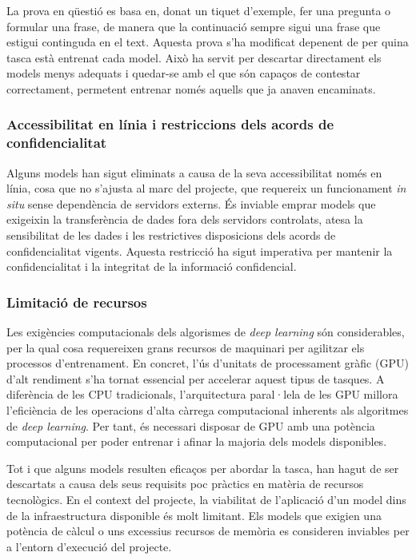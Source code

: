 La prova en qüestió es basa en, donat un tiquet d'exemple, fer una pregunta o formular una frase, de manera que la continuació sempre sigui una frase que estigui continguda en el text. Aquesta prova s'ha modificat depenent de per quina tasca està entrenat cada model. Això ha servit per descartar directament els models menys adequats i quedar-se amb el que són capaços de contestar correctament, permetent entrenar només aquells que ja anaven encaminats.

\subsubsection{Accessibilitat en línia i restriccions dels acords de confidencialitat}
Alguns models han sigut eliminats a causa de la seva accessibilitat només en línia, cosa que no s'ajusta al marc del projecte, que requereix un funcionament \textit{in situ} sense dependència de servidors externs. És inviable emprar models que exigeixin la transferència de dades fora dels servidors controlats, atesa la sensibilitat de les dades i les restrictives disposicions dels acords de confidencialitat vigents. Aquesta restricció ha sigut imperativa per mantenir la confidencialitat i la integritat de la informació confidencial.

\subsubsection{Limitació de recursos}
Les exigències computacionals dels algorismes de \textit{deep learning} són considerables, per la qual cosa requereixen grans recursos de maquinari per agilitzar els processos d'entrenament. En concret, l'ús d'unitats de processament gràfic (GPU) d'alt rendiment s'ha tornat essencial per accelerar aquest tipus de tasques. A diferència de les CPU tradicionals, l'arquitectura paral·lela de les GPU millora l'eficiència de les operacions d'alta càrrega computacional inherents als algoritmes de \textit{deep learning}. Per tant, és necessari disposar de GPU amb una potència computacional per poder entrenar i afinar la majoria dels models disponibles.

Tot i que alguns models resulten eficaços per abordar la tasca, han hagut de ser descartats a causa dels seus requisits poc pràctics en matèria de recursos tecnològics. En el context del projecte, la viabilitat de l'aplicació d'un model dins de la infraestructura disponible és molt limitant. Els models que exigien una potència de càlcul o uns excessius recursos de memòria es consideren inviables per a l'entorn d'execució del projecte.


